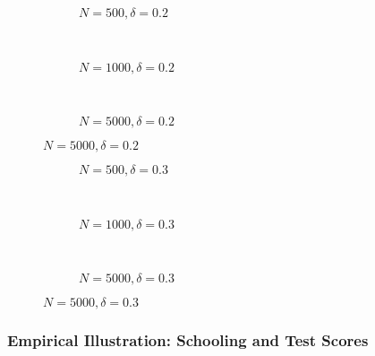 \documentclass{beamer}
\begin{document}
\begin{frame}
\begin{figure}[h]
  \scriptsize
  \begingroup
  \centering
  \begin{subfigure}[b]{0.31\textwidth}
\caption{\footnotesize $N=500, \delta = 0.2$}
  
  \end{subfigure}
  ~
  \begin{subfigure}[b]{0.31\textwidth}
    \caption{\footnotesize $N=1000, \delta = 0.2$} 
  
  \end{subfigure}
  ~
  \begin{subfigure}[b]{0.31\textwidth}
\caption{\footnotesize $N=5000, \delta = 0.2$}
  
  \end{subfigure}
\endgroup
\end{figure}
\end{frame}
\begin{frame}
\begin{figure}[h]
  \scriptsize
  \begingroup
  \centering
  \begin{subfigure}[b]{0.31\textwidth}
\caption{\footnotesize $N=500, \delta = 0.3$}
  
  \end{subfigure}
  ~
  \begin{subfigure}[b]{0.31\textwidth}
    \caption{\footnotesize $N=1000, \delta = 0.3$} 
  
  \end{subfigure}
  ~
  \begin{subfigure}[b]{0.31\textwidth}
\caption{\footnotesize $N=5000, \delta = 0.3$}
  
  \end{subfigure}
\endgroup
\end{figure}
\end{frame}
\begin{frame}
  \frametitle{Empirical Illustration: Schooling and Test Scores}
\end{frame}
\end{document}
